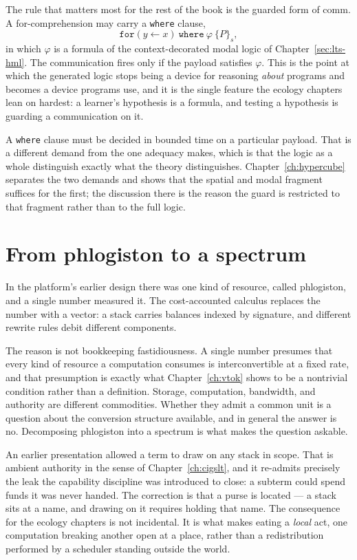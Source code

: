 The rule that matters most for the rest of the book is the guarded form
of comm.
A for-comprehension may carry a \texttt{where} clause,
\[
  \mathtt{for}(y \leftarrow x)\ \mathtt{where}\ \varphi \ \{ P \}_s ,
\]
in which $\varphi$ is a formula of the context-decorated modal logic of
Chapter~\ref{sec:lts-hml}.
The communication fires only if the payload satisfies $\varphi$.
This is the point at which the generated logic stops being a device for
reasoning \emph{about} programs and becomes a device programs use, and
it is the single feature the ecology chapters lean on hardest: a
learner's hypothesis is a formula, and testing a hypothesis is guarding a
communication on it.

\begin{remark}
\label{rmk:carho-checkable}
A \texttt{where} clause must be decided in bounded time on a particular
payload.
That is a different demand from the one adequacy makes, which is that the
logic as a whole distinguish exactly what the theory distinguishes.
Chapter~\ref{ch:hypercube} separates the two demands and shows that the
spatial and modal fragment suffices for the first; the discussion there
is the reason the guard is restricted to that fragment rather than to
the full logic.
\end{remark}

\section{From phlogiston to a spectrum}

In the platform's earlier design there was one kind of resource, called
phlogiston, and a single number measured it.
The cost-accounted calculus replaces the number with a vector: a stack
carries balances indexed by signature, and different rewrite rules debit
different components.

The reason is not bookkeeping fastidiousness.
A single number presumes that every kind of resource a computation
consumes is interconvertible at a fixed rate, and that presumption is
exactly what Chapter~\ref{ch:vtok} shows to be a nontrivial condition
rather than a definition.
Storage, computation, bandwidth, and authority are different
commodities.
Whether they admit a common unit is a question about the conversion
structure available, and in general the answer is no.
Decomposing phlogiston into a spectrum is what makes the question
askable.

\begin{remark}
\label{rmk:located-correction}
An earlier presentation allowed a term to draw on any stack in scope.
That is ambient authority in the sense of
Chapter~\ref{ch:cigslt}, and it re-admits precisely the leak the
capability discipline was introduced to close: a subterm could spend
funds it was never handed.
The correction is that a purse is located --- a stack sits at a name, and
drawing on it requires holding that name.
The consequence for the ecology chapters is not incidental.
It is what makes eating a \emph{local} act, one computation breaking
another open at a place, rather than a redistribution performed by a
scheduler standing outside the world.
\end{remark}

